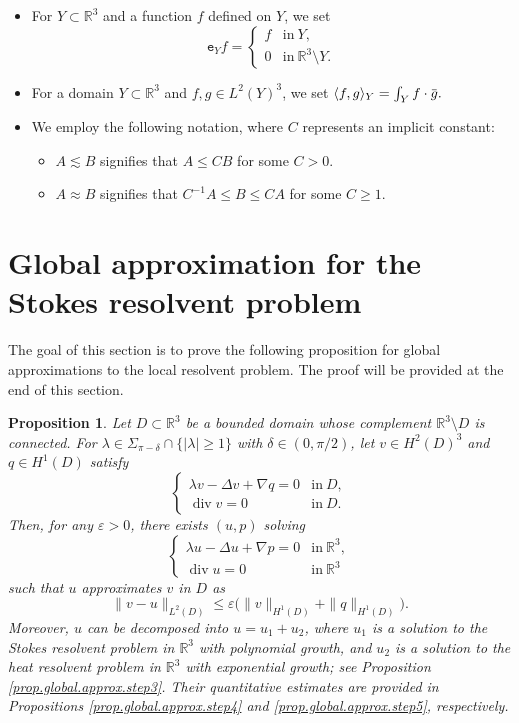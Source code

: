 \documentclass[11pt,a4paper]{article}
\numberwithin{equation}{section}
\newtheorem{proposition}[theorem]{Proposition}
{\theorembodyfont{\rmfamily}\newtheorem{remark}[theorem]{Remark}}
{\theorembodyfont{\rmfamily}\newtheorem{remarks}[theorem]{Remarks}}
\newcommand{\R}{\mathbb{R}}
\newcommand{\opdiv}{\operatorname{div}}
\newcommand{\eps}{\varepsilon}
\newcommand{\overbar}[1]{\mkern 1.5mu\overline{\mkern-1.5mu#1\mkern-1.5mu}\mkern 1.5mu}
\begin{document}
\begin{itemize}
\item 
For $Y\subset \R^3$ and a function $f$ defined on $Y$, we set 
\[
    \mathtt{e}_Y f 
    = \left\{
    \begin{array}{ll}
    f&\mbox{in}\ Y, \\
    0&\mbox{in}\ \R^3\setminus Y. 
    \end{array}\right. 
\]


\item 
For a domain $Y\subset \R^3$ and $f,g\in L^2(Y)^3$, we set 
$
    \langle f,g \rangle_Y
    = \int_Y f \cdot \overbar{g}. 
$


\item
We employ the following notation, where $C$ represents an implicit constant:
\begin{itemize}
\item
$A\lesssim B$ signifies that $A\le CB$ for some $C>0$. 


\item
$A\approx B$ signifies that $C^{-1}A\le B\le CA$ for some $C\ge1$. 
\end{itemize}
\end{itemize}


    \section{Global approximation for the Stokes resolvent problem}
    \label{sec.resolvent}


The goal of this section is to prove the following proposition for global approximations to the local resolvent problem. The proof will be provided at the end of this section. 


\begin{proposition}\label{prop.global.approx}
Let $D \subset \R^3$ be a bounded domain whose complement $\R^3\setminus D$ is connected. For $\lambda\in \Sigma_{\pi-\delta} \cap \{|\lambda| \ge 1\}$ with $\delta\in(0,\pi/2)$, let $v\in H^2(D)^3$ and $q\in H^1(D)$ satisfy
\[
    \left\{
    \begin{array}{ll}
    \lambda v - \Delta v + \nabla q
    = 0&\mbox{in}\ D, \\
    \opdiv v
    = 0&\mbox{in}\ D. 
    \end{array}\right.
\]
Then, for any $\eps>0$, there exists $(u,p)$ solving 
\[
    \left\{
    \begin{array}{ll}
    \lambda u - \Delta u + \nabla p
    = 0&\mbox{in}\ \R^3, \\
    \opdiv u
    = 0&\mbox{in}\ \R^3 
    \end{array}\right.
\]
such that $u$ approximates $v$ in $D$ as 
\[
    \|v - u\|_{L^2(D)} 
    \le 
    \eps 
    \Big( \|v\|_{H^{1}(D)} + \|q\|_{H^{1}(D)} \Big). 
\]
Moreover, $u$ can be decomposed into $u = u_1 + u_2$, where $u_1$ is a solution to the Stokes resolvent problem in $\R^3$ with polynomial growth, and $u_2$ is a solution to the heat resolvent problem in $\R^3$ with exponential growth; see Proposition \ref{prop.global.approx.step3}. Their quantitative estimates are provided in Propositions \ref{prop.global.approx.step4} and \ref{prop.global.approx.step5}, respectively.
\end{proposition}
\end{document}
